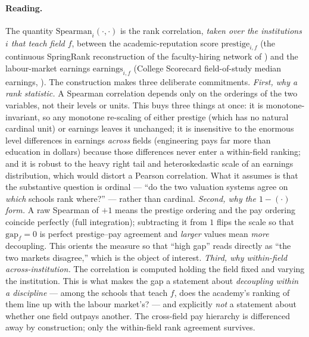 \documentclass[11pt]{article}
\begin{document}
\paragraph{Reading.}
The quantity $\mathrm{Spearman}_i(\cdot,\cdot)$ is the rank correlation, \emph{taken over the institutions $i$ that teach field $f$}, between the academic-reputation score $\mathrm{prestige}_{i,f}$ (the continuous SpringRank reconstruction of the faculty-hiring network of \citet{wapman2022quantifying,debacco2018physical}) and the labour-market earnings $\mathrm{earnings}_{i,f}$ (College Scorecard field-of-study median earnings, \citealp{scorecard}). The construction makes three deliberate commitments. \emph{First, why a rank statistic.} A Spearman correlation depends only on the orderings of the two variables, not their levels or units. This buys three things at once: it is monotone-invariant, so any monotone re-scaling of either prestige (which has no natural cardinal unit) or earnings leaves it unchanged; it is insensitive to the enormous level differences in earnings \emph{across} fields (engineering pays far more than education in dollars) because those differences never enter a within-field ranking; and it is robust to the heavy right tail and heteroskedastic scale of an earnings distribution, which would distort a Pearson correlation. What it assumes is that the substantive question is ordinal --- ``do the two valuation systems agree on \emph{which} schools rank where?'' --- rather than cardinal. \emph{Second, why the $1-(\cdot)$ form.} A raw Spearman of $+1$ means the prestige ordering and the pay ordering coincide perfectly (full integration); subtracting it from $1$ flips the scale so that $\mathrm{gap}_f=0$ is perfect prestige--pay agreement and \emph{larger} values mean \emph{more} decoupling. This orients the measure so that ``high gap'' reads directly as ``the two markets disagree,'' which is the object of interest. \emph{Third, why within-field across-institution.} The correlation is computed holding the field fixed and varying the institution. This is what makes the gap a statement about \emph{decoupling within a discipline} --- among the schools that teach $f$, does the academy's ranking of them line up with the labour market's? --- and explicitly \emph{not} a statement about whether one field outpays another. The cross-field pay hierarchy is differenced away by construction; only the within-field rank agreement survives.
\end{document}
